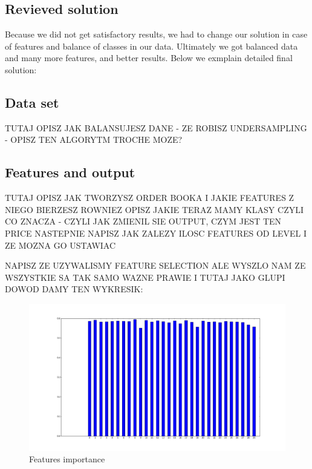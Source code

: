 \documentclass[twoside]{article}
\begin{document}
\begin{multicols}{2}
\section{Revieved solution}

Because we did not get satisfactory results, we had to change our solution in case of features and
balance of classes in our data. Ultimately we got balanced data and many more features, and better results.
Below we exmplain detailed final solution:

\subsection{Data set}

TUTAJ OPISZ JAK BALANSUJESZ DANE - ZE ROBISZ UNDERSAMPLING - OPISZ TEN ALGORYTM TROCHE MOZE?

\subsection{Features and output}

TUTAJ OPISZ JAK TWORZYSZ ORDER BOOKA I JAKIE FEATURES Z NIEGO BIERZESZ
ROWNIEZ OPISZ JAKIE TERAZ MAMY KLASY CZYLI CO ZNACZA - CZYLI JAK ZMIENIL SIE OUTPUT, CZYM JEST TEN PRICE
NASTEPNIE NAPISZ JAK ZALEZY ILOSC FEATURES OD LEVEL I ZE MOZNA GO USTAWIAC

NAPISZ ZE UZYWALISMY FEATURE SELECTION ALE WYSZLO NAM ZE WSZYSTKIE SA TAK SAMO WAZNE PRAWIE I TUTAJ JAKO
GLUPI DOWOD DAMY TEN WYKRESIK:

\begin{figure}[H]
\centering
\includegraphics[scale=0.15]{../results/features}
\caption{Features importance}
\label{ref:rnn}
\end{figure} 


\end{multicols}
\end{document}
